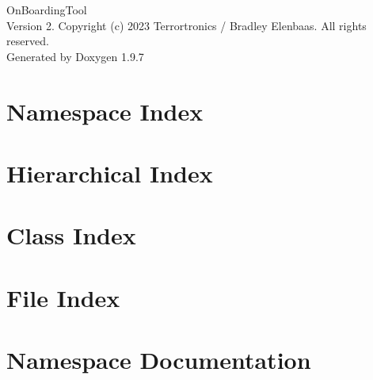 \documentclass[twoside]{book}
\newcommand{\+}{\discretionary{\mbox{\scriptsize$\hookleftarrow$}}{}{}}
\newcommand{\clearemptydoublepage}{%
    \newpage{\pagestyle{empty}\cleardoublepage}%
  }
\begin{document}
  \raggedbottom
    \hypersetup{pageanchor=false,
                bookmarksnumbered=true,
                pdfencoding=unicode
               }
  \begin{titlepage}
  \vspace*{7cm}
  \begin{center}%
  {\Large On\+Boarding\+Tool}\\
  [1ex]\large Version 2. Copyright (c) 2023 Terrortronics / Bradley Elenbaas. All rights reserved. \\
  \vspace*{1cm}
  {\large Generated by Doxygen 1.9.7}\\
  \end{center}
  \end{titlepage}
  \clearemptydoublepage
  \tableofcontents
  \clearemptydoublepage
  \hypersetup{pageanchor=true}
\chapter{Namespace Index}

\chapter{Hierarchical Index}

\chapter{Class Index}

\chapter{File Index}

\chapter{Namespace Documentation}

\end{document}
